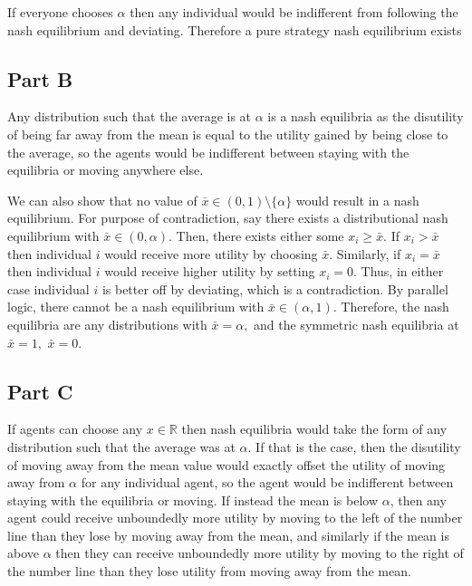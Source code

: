 \documentclass[11pt]{article} %
\begin{document}
If everyone chooses $\alpha$ then any individual would be indifferent from following the nash equilibrium and deviating. Therefore a pure strategy nash equilibrium exists

\subsection{Part B}
Any distribution such that the average is at $\alpha$ is a nash equilibria as the disutility of being far away from the mean is equal to the utility gained by being close to the average, so the agents would be indifferent between staying with the equilibria or moving anywhere else.

We can also show that no value of $\bar{x} \in (0,1) \setminus \{ \alpha\}$ would result in a nash equilibrium. For purpose of contradiction, say there exists a distributional nash equilibrium with $\bar{x} \in (0,\alpha).$ Then, there exists either some $x_i \geq \bar{x}$. If $x_i>\bar{x}$ then individual $i$ would receive more utility by choosing $\bar{x}.$ Similarly, if $x_i = \bar{x}$ then individual $i$ would receive higher utility by setting $x_i = 0$. Thus, in either case individual $i$ is better off by deviating, which is a contradiction. By parallel logic, there cannot be a nash equilibrium with  $\bar{x} \in (\alpha,1).$ Therefore, the nash equilibria are any distributions with $\bar{x} = \alpha,$ and the symmetric nash equilibria at $\bar{x} = 1,$ $\bar{x} = 0.$
\subsection{Part C}
If agents can choose any $x\in \mathbb{R}$ then nash equilibria would take the form of any distribution such that the average was at $\alpha$. If that is the case, then the disutility of moving away from the mean value would exactly offset the utility of moving away from $\alpha$ for any individual agent, so the agent would be indifferent between staying with the equilibria or moving. If instead the mean is below $\alpha$, then any agent could receive unboundedly more utility by moving to the left of the number line than they lose by moving away from the mean, and similarly if the mean is above $\alpha$ then they can receive unboundedly more utility by moving to the right of the number line than they lose utility from moving away from the mean.
\end{document}
